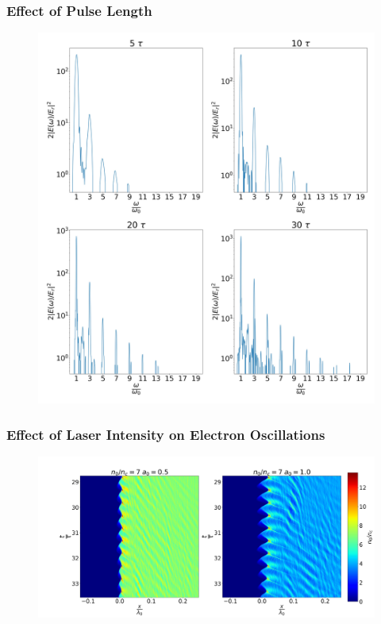 \documentclass{beamer}
\begin{document}
\begin{frame}
\begin{minipage}[t]{0.64\linewidth}
\begin{figure}
            \label{fig:LaserEnv}
        \end{figure}
    \end{minipage}

\end{frame}

\begin{frame}
    \frametitle{Effect of Pulse Length}
    \begin{figure}
        \centering
        \includegraphics[width=1.0\textwidth, height=0.8\textheight]{images/pulse.jpg}
        \label{fig:LaserPulsev}
    \end{figure}
\end{frame}
\begin{frame}
    \frametitle{Effect of Laser Intensity on Electron Oscillations}
    \begin{figure}
        \centering
        \includegraphics[width=1.0\textwidth, height=0.8\textheight]{images/oscillation1.jpg}
        \label{fig:Oscillations1}
    \end{figure}
\end{frame}
\end{document}
